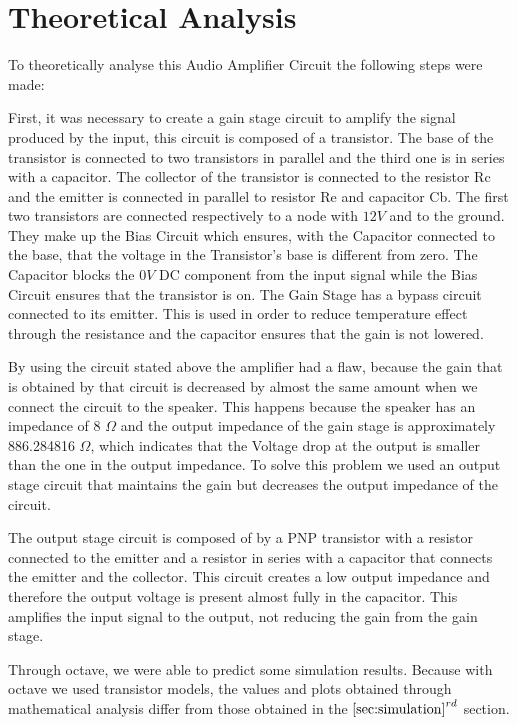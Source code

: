 
\section{Theoretical Analysis}
\label{sec:analysis}

To theoretically analyse this Audio Amplifier Circuit the following steps were made:
\par
\par
First, it was necessary to create a gain stage circuit to amplify the signal produced by the input, this circuit is composed of a transistor. The base of the transistor is connected to two transistors in parallel and the third one is in series with a capacitor. The collector of the transistor is connected to the resistor Rc and the emitter is connected in parallel to resistor Re and capacitor Cb. The first two transistors are connected respectively to a node with $12V$ and to the ground. They make up the Bias Circuit which ensures, with the Capacitor connected to the base, that the voltage in the Transistor's base is different from zero. The Capacitor blocks the $0V$ DC component from the input signal while the Bias Circuit ensures that the transistor is on.
The Gain Stage has a bypass circuit connected to its emitter. This is used in order to reduce temperature effect through the resistance and the capacitor ensures that the gain is not lowered.
\par
\par
By using the circuit stated above the amplifier had a flaw, because the gain that is obtained by that circuit is decreased by almost the same amount when we connect the circuit to the speaker. This happens because the speaker has an impedance of 8 $\Omega$ and the output impedance of the gain stage is approximately 886.284816 $\Omega$, which indicates that the Voltage drop at the output is smaller than the one in the output impedance. To solve this problem we used an output stage circuit that maintains the gain but decreases the output impedance of the circuit. 

The output stage circuit is composed of by a PNP transistor with a resistor connected to the emitter and a resistor in series with a capacitor that connects the emitter and the collector. This circuit creates a low output impedance and therefore the output voltage is present almost fully in the capacitor. This amplifies the input signal to the output, not reducing the gain from the gain stage.

Through octave, we were able to predict some simulation results. Because with octave we used transistor models, the values and plots obtained through mathematical analysis differ from those obtained in the $\ref{sec:simulation}^{rd}$ section.


